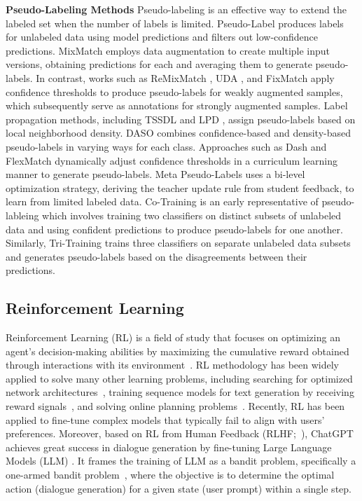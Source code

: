 \textbf{Pseudo-Labeling Methods} 
Pseudo-labeling is an effective way to
extend the labeled set when the number of labels is limited. Pseudo-Label \cite{lee2013pseudo} produces labels for unlabeled data using model predictions and filters out low-confidence predictions. MixMatch \cite{berthelot2019mixmatch} employs data augmentation to create multiple input versions, obtaining predictions for each and averaging them to generate pseudo-labels. In contrast, works such as ReMixMatch \cite{berthelot2020remixmatch}, UDA \cite{xie2020unsupervised}, and FixMatch \cite{sohn2020fixmatch} apply confidence thresholds to produce pseudo-labels for weakly augmented samples, which subsequently serve as annotations for strongly augmented samples.
Label propagation methods, including TSSDL \cite{shi2018transductive} and LPD \cite{iscen2019label}, assign pseudo-labels based on local neighborhood density. DASO \cite{oh2021distribution} combines confidence-based and density-based pseudo-labels in varying ways for each class. Approaches such as Dash \cite{xu2021dash} and FlexMatch \cite{zhang2021flexmatch} dynamically adjust confidence thresholds in a curriculum learning manner to generate pseudo-labels. Meta Pseudo-Labels \cite{pham2021meta} uses a bi-level optimization strategy, deriving the teacher update rule from student feedback, to learn from limited labeled data.
Co-Training \cite{blum1998combining} is an early representative of pseudo-lableing which involves training two classifiers on distinct subsets of unlabeled data and using confident predictions to produce pseudo-labels for one another. Similarly, Tri-Training \cite{zhou2005tri} trains three classifiers on separate unlabeled data subsets and generates pseudo-labels based on the disagreements between their predictions.

\subsection{Reinforcement Learning}

Reinforcement Learning (RL) is a field of study that focuses on optimizing an agent's decision-making abilities by maximizing the cumulative reward obtained through interactions with its environment~\citep{sutton2018reinforcement}. 
RL methodology has been widely applied to solve many other learning problems, including  
searching for optimized network architectures~\citep{zoph2016neural},
training sequence models for text generation by receiving reward signals~\citep{bahdanau2016actor,ranzato2015sequence},
and solving online planning problems~\citep{fickinger2021scalable}.
Recently, RL has been applied to fine-tune complex models that typically fail to align with users' preferences. 
Moreover, based on RL from Human Feedback (RLHF;~\citep{christiano2017deep, ziegler2019fine, stiennon2020learning}), 
ChatGPT achieves great success in dialogue generation by fine-tuning Large Language Models (LLM)
\citep{ouyang2022training}. 
It frames the training of LLM as a bandit problem, 
specifically a one-armed bandit problem~\citep{sutton2018reinforcement}, 
where the objective is to determine the optimal action (dialogue generation) for a given state (user prompt) 
within a single step. 


